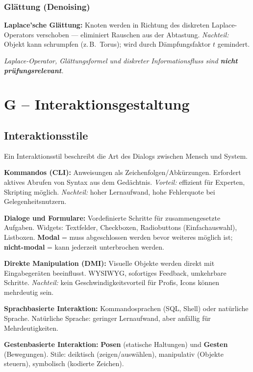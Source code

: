 \documentclass[12pt, a4paper]{article}
\begin{document}
\subsubsection*{Glättung (Denoising)}

\textbf{Laplace'sche Glättung:} Knoten werden in Richtung des diskreten Laplace-Operators verschoben — eliminiert Rauschen aus der Abtastung. \textit{Nachteil:} Objekt kann schrumpfen (z.\,B.\ Torus); wird durch Dämpfungsfaktor $t$ gemindert.

\textit{Laplace-Operator, Glättungsformel und diskreter Informationsfluss sind \textbf{nicht prüfungsrelevant}.}

\section{G -- Interaktionsgestaltung}

\subsection{Interaktionsstile}

Ein Interaktionsstil beschreibt die Art des Dialogs zwischen Mensch und System.

\textbf{Kommandos (CLI):} Anweisungen als Zeichenfolgen/Abkürzungen. Erfordert aktives Abrufen von Syntax aus dem Gedächtnis. \textit{Vorteil:} effizient für Experten, Skripting möglich. \textit{Nachteil:} hoher Lernaufwand, hohe Fehlerquote bei Gelegenheitsnutzern.

\textbf{Dialoge und Formulare:} Vordefinierte Schritte für zusammengesetzte Aufgaben. Widgets: Textfelder, Checkboxen, Radiobuttons (Einfachauswahl), Listboxen. \textbf{Modal} = muss abgeschlossen werden bevor weiteres möglich ist; \textbf{nicht-modal} = kann jederzeit unterbrochen werden.

\textbf{Direkte Manipulation (DMI):} Visuelle Objekte werden direkt mit Eingabegeräten beeinflusst. WYSIWYG, sofortiges Feedback, umkehrbare Schritte. \textit{Nachteil:} kein Geschwindigkeitsvorteil für Profis, Icons können mehrdeutig sein.

\textbf{Sprachbasierte Interaktion:} Kommandosprachen (SQL, Shell) oder natürliche Sprache. Natürliche Sprache: geringer Lernaufwand, aber anfällig für Mehrdeutigkeiten.

\textbf{Gestenbasierte Interaktion:} \textbf{Posen} (statische Haltungen) und \textbf{Gesten} (Bewegungen). Stile: deiktisch (zeigen/auswählen), manipulativ (Objekte steuern), symbolisch (kodierte Zeichen).
\end{document}
